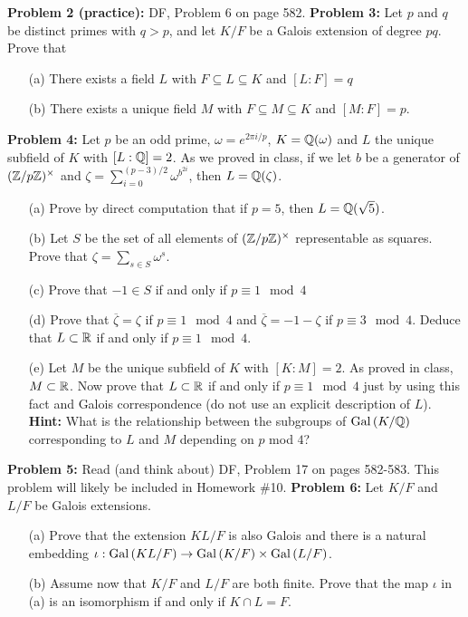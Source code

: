 \documentclass[12pt]{article}
\begin{document}
{\bf Problem 2 (practice):} DF, Problem 6 on page 582.
\skv
{\bf Problem 3:} Let $p$ and $q$ be distinct primes with $q>p$,
and let $K/F$ be a Galois extension of degree $pq$. Prove that
\begin{itemize}
\item[(a)] There exists a field $L$ with $F\subseteq L\subseteq K$ and $[L:F]=q$

\item[(b)] There exists a unique field $M$ with $F\subseteq M\subseteq K$ and $[M:F]=p$.
\end{itemize}
\skv
{\bf Problem 4:} Let $p$ be an odd prime, $\omega=e^{2\pi i/p}$, $K={\mathbb Q}(\omega)$
and $L$ the unique subfield of $K$ with $[L:{\mathbb Q}]=2$. As we proved in class, if we let
$b$ be a generator of $({\mathbb Z}/p{\mathbb Z})^{\times}$ and $\zeta=\sum_{i=0}^{(p-3)/2} \omega^{b^{2i}}$,
then $L={\mathbb Q}(\zeta)$.
\begin{itemize}
\item[(a)] Prove by direct computation that if $p=5$, then $L={\mathbb Q}(\sqrt{5})$.
\item[(b)] Let $S$ be the set of all elements of $({\mathbb Z}/p{\mathbb Z})^{\times}$ representable 
as squares. Prove that $\zeta=\sum_{s\in S}\omega^s$.
\item[(c)] Prove that $-1\in S$ if and only if $p\equiv 1\mod 4$
\item[(d)] Prove that $\overline\zeta=\zeta$ if $p\equiv 1\mod 4$ and $\overline\zeta=-1-\zeta$
if $p\equiv 3\mod 4$. Deduce that $L\subset {\mathbb R}$ if and only if $p\equiv 1\mod 4$.
\item[(e)] Let $M$ be the unique subfield of $K$ with $[K:M]=2$. As proved in class,
$M\subset {\mathbb R}$. Now prove that $L\subset {\mathbb R}$ if and only if $p\equiv 1\mod 4$ just 
by using this fact and Galois correspondence (do not use an explicit description of $L$).
{\bf Hint:} What is the relationship between the subgroups of ${\rm Gal\,}(K/{\mathbb Q})$ corresponding
to $L$ and $M$ depending on $p$ mod $4$?
\end{itemize} 
\skv
{\bf Problem 5:} Read (and think about) DF, Problem 17 on pages 582-583. 
This problem will likely be included in Homework \#10.
\skv
{\bf Problem 6:} Let $K/F$ and $L/F$ be Galois extensions.

\begin{itemize}
\item[(a)] Prove that the extension $KL/F$ is also Galois and there is a natural
embedding $\iota:{\rm Gal\,}(KL/F)\to {\rm Gal\,}(K/F)\times {\rm Gal\,}(L/F)$.

\item[(b)]
Assume now that $K/F$ and $L/F$ are both finite. Prove that the map $\iota$ in (a)
is an isomorphism if and only if $K\cap L=F$.
\end{itemize}
\end{document}
